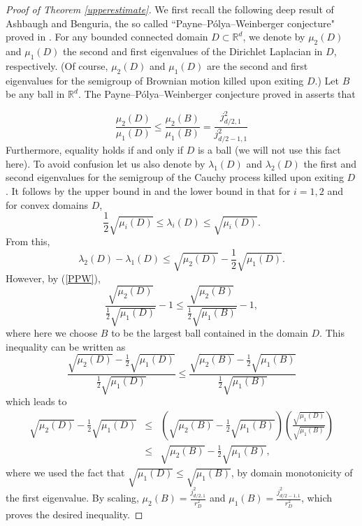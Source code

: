 \documentclass[11pt,leqno]{article}
\theoremstyle{definition}
\newcommand{\Rd}{\mathbb{R}^d}
\numberwithin{equation}{section}
\begin{document}
\begin{proof}[Proof of Theorem \ref{upperestimate}] We first recall the following deep result
of Ashbaugh and Benguria,  the so called ``Payne--P\'olya--Weinberger
conjecture" proved in  \cite{AB2} .   For any bounded connected domain $D\subset \Rd$, we denote by
$\mu_2(D)$ and $\mu_1(D)$ the second and first eigenvalues of the
Dirichlet Laplacian in $D$, respectively. (Of course, $\mu_2(D)$ and
$\mu_1(D)$  are the second and first eigenvalues for the semigroup of
Brownian motion killed upon exiting $D$.) Let $B$ be any ball in $\Rd$.  
The Payne--P\'olya--Weinberger conjecture proved
in \cite{AB2} asserts that 

\begin{equation}\label{PPW}
\frac{\mu_2(D)}{\mu_1(D)}\leq
 \frac{\mu_2(B)}{\mu_1(B)}=\frac{j_{{d/2}, 1}^2}{j_{{d/2-1},1}^2}
\end{equation}
Furthermore,  equality holds if and only if $D$ is a ball (we will  not use this fact here).    
To avoid confusion let us also denote by $\lambda_1(D)$ and $\lambda_2(D)$ the first and second eigenvalues
for the semigroup of the Cauchy  process killed upon exiting $D$.  It follows by the upper bound in \cite{BK} and the
lower bound in \cite{CS3} that for $i=1, 2$ and for convex domains $D$,  
\begin{equation}\label{gapupper}
\frac{1}{2} \sqrt{\mu_i(D)}\leq \lambda_i(D)\leq \sqrt{\mu_i(D)}.
\end{equation}
From this, 
\begin{equation}
\lambda_2(D)-\lambda_1(D)\leq \sqrt{\mu_2(D)}-{\frac{1}{2}}\sqrt{\mu_1(D)}.
\end{equation}
However, by (\ref{PPW}), 
$$
\frac{\sqrt{\mu_2(D)}}{{\frac{1}{2}}\sqrt{\mu_1(D)}}-1\leq
\frac{\sqrt{\mu_2(B)}}{{\frac{1}{2}}\sqrt{\mu_1(B)}}-1,
$$
where here we choose $B$ to be the largest ball contained in the domain $D$. 
  This inequality can be written as 
$$
{\frac{\sqrt{\mu_2(D)}-{\frac{1}{2}}\sqrt{\mu_1(D)}}{{\frac{1}{2}}\sqrt{\mu_1(D)}}}\leq 
{\frac{\sqrt{\mu_2(B)}-{\frac{1}{2}}\sqrt{\mu_1(B)}}{{\frac{1}{2}}\sqrt{\mu_1(B)}}}
$$
which leads to 
\begin{eqnarray}
\sqrt{\mu_2(D)}-{\frac{1}{2}}\sqrt{\mu_1(D)}&\leq&
\left(\sqrt{\mu_2(B)}-{\frac{1}{2}}\sqrt{\mu_1(B)}\right)
\left(\frac{\sqrt{\mu_1(D)}}{\sqrt{\mu_1(B)}}\right)\\
&\leq & \sqrt{\mu_2(B)}-{\frac{1}{2}}\sqrt{\mu_1(B)},\nonumber
\end{eqnarray}
where we used the fact that 
$\sqrt{\mu_1(D)}\leq \sqrt{\mu_1(B)}$, by domain monotonicity of the first eigenvalue. 
By scaling, 
$\mu_2(B)=\frac{j_{{d/2}, 1}^2}{r_D^2}$ and $\mu_1(B)=\frac{j_{{d/2-1}, 1}^2}{r_D^2}$,
which proves  the desired inequality.  
\end{proof}
\end{document}
